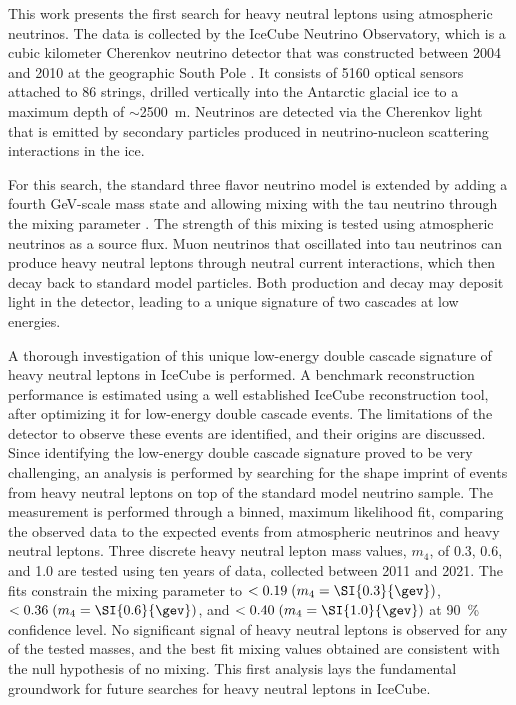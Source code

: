 This work presents the first search for heavy neutral leptons using atmospheric neutrinos. The data is collected by the IceCube Neutrino Observatory, which is a cubic kilometer Cherenkov neutrino detector that was constructed between 2004 and 2010 at the geographic South Pole . It consists of 5160 optical sensors attached to 86 strings, drilled vertically into the Antarctic glacial ice to a maximum depth of $\sim$\SI{2500}{\meter}. Neutrinos are detected via the Cherenkov light that is emitted by secondary particles produced in neutrino-nucleon scattering interactions in the ice.

For this search, the standard three flavor neutrino model is extended by adding a fourth GeV-scale mass state and allowing mixing with the tau neutrino through the mixing parameter . The strength of this mixing is tested using atmospheric neutrinos as a source flux. Muon neutrinos that oscillated into tau neutrinos can produce heavy neutral leptons through neutral current interactions, which then decay back to standard model particles. Both production and decay may deposit light in the detector, leading to a unique signature of two cascades at low energies.

A thorough investigation of this unique low-energy double cascade signature of heavy neutral leptons in IceCube is performed. A benchmark reconstruction performance is estimated using a well established IceCube reconstruction tool, after optimizing it for low-energy double cascade events. The limitations of the detector to observe these events are identified, and their origins are discussed. Since identifying the low-energy double cascade signature proved to be very challenging, an analysis is performed by searching for the shape imprint of events from heavy neutral leptons on top of the standard model neutrino sample. The measurement is performed through a binned, maximum likelihood fit, comparing the observed data to the expected events from atmospheric neutrinos and heavy neutral leptons. Three discrete heavy neutral lepton mass values, $m_4$, of \SI{0.3}{\gev}, \SI{0.6}{\gev}, and \SI{1.0}{\gev} are tested using ten years of data, collected between 2011 and 2021. The fits constrain the mixing parameter to $ < 0.19\;(m_4 = \SI{0.3}{\gev})$, $ < 0.36\;(m_4 = \SI{0.6}{\gev})$, and $ < 0.40\;(m_4 = \SI{1.0}{\gev})$ at \SI{90}{\percent} confidence level. No significant signal of heavy neutral leptons is observed for any of the tested masses, and the best fit mixing values obtained are consistent with the null hypothesis of no mixing. This first analysis lays the fundamental groundwork for future searches for heavy neutral leptons in IceCube.

